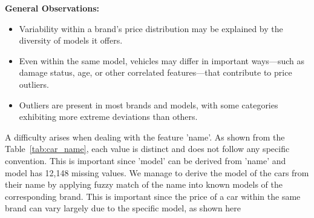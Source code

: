 \documentclass[conference]{IEEEtran}
\begin{document}
\vspace{1em}
\noindent\textbf{General Observations:}
\begin{itemize}
    \item Variability within a brand’s price distribution may be explained by
            the diversity of models it offers.
    \item Even within the same model, vehicles may differ in important
            ways—such as damage status, age, or other correlated features—that
            contribute to price outliers.
    \item Outliers are present in most brands and models, with some categories
            exhibiting more extreme deviations than others.
\end{itemize}

\begin{table}[H]
\centering
{}
\caption{Sample of car name, model, and brand from dataset}
\label{tab:car_name}
\end{table}

A difficulty arises when dealing with the feature 'name'. As shown from the
Table~\ref{tab:car_name}, each value is distinct and does not follow any
specific convention. This is important since 'model' can be derived from 'name'
and model has 12,148 missing values. We manage to derive the model of the cars
from their name by applying fuzzy match of the name into known models of the
corresponding brand. This is important since the price of a car within the same
brand can vary largely due to the specific model, as shown here 
\end{document}
